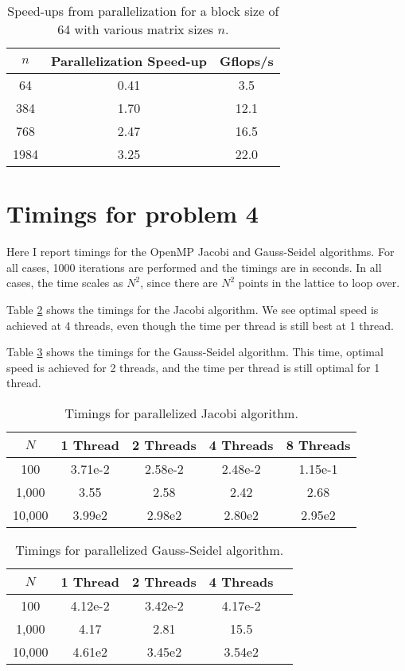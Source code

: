 \documentclass[a4paper]{article}
\begin{document}
\begin{table}[ht]
\centering
\begin{tabular}{c|c|c}
$n$ & Parallelization Speed-up& Gflops/s\\[2 pt] \hline
64 & 0.41 & 3.5\\[2 pt]
384 & 1.70 & 12.1\\[2 pt]
768 & 2.47 & 16.5\\[2 pt]
1984 & 3.25 & 22.0
\end{tabular}
\caption{Speed-ups from parallelization for a block size of 64 with various matrix sizes $n$.}
\label{tab:parallelspeeds}
\end{table}


\section*{Timings for problem 4}
Here I report timings for the OpenMP Jacobi and Gauss-Seidel algorithms. For all cases, 1000 iterations are performed and the timings are in seconds. In all cases, the time scales as $N^2$, since there are $N^2$ points in the lattice to loop over. 

Table \ref{tab:jacobispeeds} shows the timings for the Jacobi algorithm. We see optimal speed is achieved at 4 threads, even though the time per thread is still best at 1 thread. 

Table \ref{tab:gsspeeds} shows the timings for the Gauss-Seidel algorithm. This time, optimal speed is achieved for 2 threads, and the time per thread is still optimal for 1 thread. 

\begin{table}[ht]
\centering
\begin{tabular}{c|c|c|c|c}
$N$ & 1 Thread& 2 Threads & 4 Threads & 8 Threads\\[2 pt] \hline
100 & 3.71e-2 & 2.58e-2 & 2.48e-2 & 1.15e-1\\[2 pt]
1,000 & 3.55 & 2.58 & 2.42 &  2.68\\[2 pt]
10,000 &3.99e2 & 2.98e2 & 2.80e2  & 2.95e2
\end{tabular}
\caption{Timings for parallelized Jacobi algorithm. }
\label{tab:jacobispeeds}
\end{table}

\begin{table}[ht]
\centering
\begin{tabular}{c|c|c|c|c}
$N$ & 1 Thread& 2 Threads & 4 Threads \\[2 pt] \hline
100 & 4.12e-2 & 3.42e-2 & 4.17e-2\\[2 pt]
1,000 & 4.17 & 2.81 & 15.5 \\[2 pt]
10,000 &4.61e2 & 3.45e2 & 3.54e2
\end{tabular}
\caption{Timings for parallelized Gauss-Seidel algorithm.}
\label{tab:gsspeeds}
\end{table}
\end{document}
